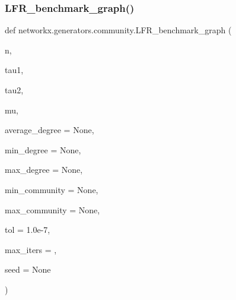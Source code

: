 \subsubsection{\texorpdfstring{L\+F\+R\+\_\+benchmark\+\_\+graph()}{LFR\_benchmark\_graph()}}
{\footnotesize\ttfamily def networkx.\+generators.\+community.\+L\+F\+R\+\_\+benchmark\+\_\+graph (\begin{DoxyParamCaption}\item[{}]{n,  }\item[{}]{tau1,  }\item[{}]{tau2,  }\item[{}]{mu,  }\item[{}]{average\+\_\+degree = {\ttfamily None},  }\item[{}]{min\+\_\+degree = {\ttfamily None},  }\item[{}]{max\+\_\+degree = {\ttfamily None},  }\item[{}]{min\+\_\+community = {\ttfamily None},  }\item[{}]{max\+\_\+community = {\ttfamily None},  }\item[{}]{tol = {\ttfamily 1.0e-\/7},  }\item[{}]{max\+\_\+iters = {},  }\item[{}]{seed = {\ttfamily None} }\end{DoxyParamCaption})}

